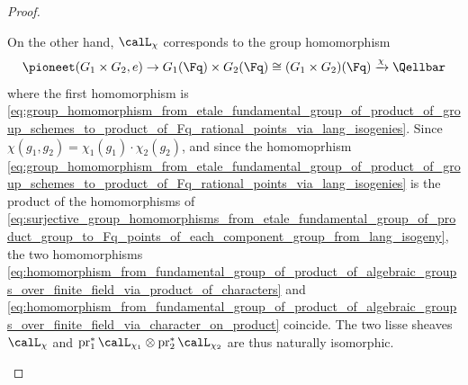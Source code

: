 \begin{proof}
\begin{enumerate}
        On the other hand, $\calL_\chi$ corresponds to the group homomorphism 
        \begin{equation}\label{eq:homomorphism_from_fundamental_group_of_product_of_algebraic_groups_over_finite_field_via_character_on_product}
        \pioneet(G_1 \times G_2, e) \to G_1(\Fq) \times G_2(\Fq) \cong (G_1 \times G_2)(\Fq) \xrightarrow{\chi} \Qellbar
        \end{equation}
        where the first homomorphism is \eqref{eq:group_homomorphism_from_etale_fundamental_group_of_product_of_group_schemes_to_product_of_Fq_rational_points_via_lang_isogenies}. Since $\chi(g_1,g_2) = \chi_1(g_1) \cdot \chi_2(g_2)$, and since the homomoprhism \eqref{eq:group_homomorphism_from_etale_fundamental_group_of_product_of_group_schemes_to_product_of_Fq_rational_points_via_lang_isogenies} is the product of the homomorphisms of \eqref{eq:surjective_group_homomorphisms_from_etale_fundamental_group_of_product_group_to_Fq_points_of_each_component_group_from_lang_isogeny}, the two homomorphisms \eqref{eq:homomorphism_from_fundamental_group_of_product_of_algebraic_groups_over_finite_field_via_product_of_characters} and \eqref{eq:homomorphism_from_fundamental_group_of_product_of_algebraic_groups_over_finite_field_via_character_on_product} coincide. The two lisse sheaves $\calL_\chi$ and $\operatorname{pr}_1^* \calL_{\chi_1} \otimes \operatorname{pr}_2^* \calL_{\chi_2}$ are thus naturally isomorphic.
    \end{enumerate}
\end{proof}

